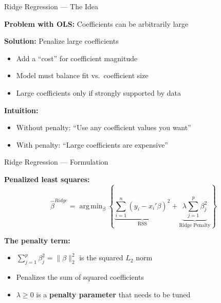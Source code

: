 \documentclass[10pt]{beamer}
\newcommand{\highlight}[1]{\textcolor{AccentOrange}{\textbf{#1}}}
\DeclareMathOperator*{\argmin}{arg\,min}
\begin{document}
\begin{frame}{Ridge Regression --- The Idea}

\textbf{Problem with OLS:} Coefficients can be arbitrarily large

\vspace{1em}
\textbf{Solution:} Penalize large coefficients
\begin{itemize}
  \item Add a ``cost'' for coefficient magnitude
  \item Model must balance fit vs.\ coefficient size
  \item Large coefficients only if strongly supported by data
\end{itemize}

\vspace{1em}
\textbf{Intuition:} 
\begin{itemize}
  \item Without penalty: ``Use any coefficient values you want''
  \item With penalty: ``Large coefficients are expensive''
\end{itemize}

\end{frame}


\begin{frame}{Ridge Regression --- Formulation}

\textbf{Penalized least squares:}
\[
\widehat{\beta}^{Ridge} = \argmin_\beta \left\{ \underbrace{\sum_{i=1}^n (y_i - x_i'\beta)^2}_{\text{RSS}} + \underbrace{\lambda \sum_{j=1}^p \beta_j^2}_{\text{Ridge Penalty}} \right\}
\]

\vspace{1em}
\textbf{The penalty term:}
\begin{itemize}
  \item $\sum_{j=1}^p \beta_j^2 = \|\beta\|_2^2$ is the squared $L_2$ norm
  \item Penalizes the sum of squared coefficients
  \item $\lambda \geq 0$ is a \highlight{penalty parameter} that needs to be tuned
\end{itemize}

\end{frame}

\end{document}
